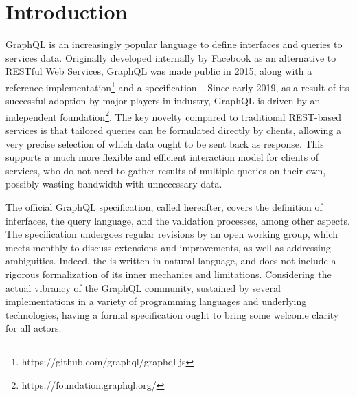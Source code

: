 \section{Introduction}

GraphQL is an increasingly popular language to define interfaces and queries to services data. Originally developed internally by Facebook as an alternative to RESTful Web Services, GraphQL was made public in 2015, along with a reference implementation\footnote{https://github.com/graphql/graphql-js} and a specification~\cite{gqlspec}. Since early 2019, as a result of its successful adoption by major players in industry,
GraphQL is driven by an independent foundation\footnote{https://foundation.graphql.org/}. The key novelty compared to traditional REST-based services is that tailored queries can be formulated directly by clients, allowing a very precise selection of which data ought to be sent back as response. This supports a much more flexible and efficient interaction model for clients of services, who do not need to gather results of multiple queries on their own, possibly wasting bandwidth with unnecessary data.


The official GraphQL specification, called \spec{} hereafter, 
covers the definition of interfaces, the query language, and the validation processes, among other aspects. The specification undergoes regular revisions by an open working group, which meets monthly to discuss extensions and improvements, as well as addressing ambiguities. Indeed, the \spec{} is written in natural language, and does not include a rigorous formalization of  its inner mechanics and limitations.
Considering the actual vibrancy of the GraphQL community, sustained by several implementations in a variety of programming languages and underlying technologies, having a formal specification ought to bring some welcome clarity for all actors.

